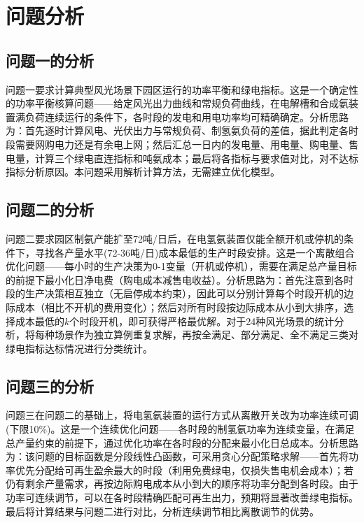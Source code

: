 \section{问题分析}

\subsection{问题一的分析}

问题一要求计算典型风光场景下园区运行的功率平衡和绿电指标。这是一个确定性的功率平衡核算问题——给定风光出力曲线和常规负荷曲线，在电解槽和合成氨装置满负荷连续运行的条件下，各时段的发电和用电功率均可精确确定。分析思路为：首先逐时计算风电、光伏出力与常规负荷、制氢氨负荷的差值，据此判定各时段需要网购电力还是有余电上网；然后汇总一日内的发电量、用电量、购电量、售电量，计算三个绿电直连指标和吨氨成本；最后将各指标与要求值对比，对不达标指标分析原因。本问题采用解析计算方法，无需建立优化模型。

\subsection{问题二的分析}

问题二要求园区制氨产能扩至72吨/日后，在电氢氨装置仅能全额开机或停机的条件下，寻找各产量水平(72-36吨/日)成本最低的生产时段安排。这是一个离散组合优化问题——每小时的生产决策为0-1变量（开机或停机），需要在满足总产量目标的前提下最小化日净电费（购电成本减售电收益）。分析思路为：首先注意到各时段的生产决策相互独立（无启停成本约束），因此可以分别计算每个时段开机的边际成本（相比不开机的费用变化）；然后对所有时段按边际成本从小到大排序，选择成本最低的$k$个时段开机，即可获得严格最优解。对于24种风光场景的统计分析，将每种场景作为独立算例重复求解，再按全满足、部分满足、全不满足三类对绿电指标达标情况进行分类统计。

\subsection{问题三的分析}

问题三在问题二的基础上，将电氢氨装置的运行方式从离散开关改为功率连续可调(下限10\%)。这是一个连续优化问题——各时段的制氢氨功率为连续变量，在满足总产量约束的前提下，通过优化功率在各时段的分配来最小化日总成本。分析思路为：该问题的目标函数是分段线性凸函数，可采用贪心分配策略求解——首先将功率优先分配给可再生盈余最大的时段（利用免费绿电，仅损失售电机会成本）；若仍有剩余产量需求，再按边际购电成本从小到大的顺序将功率分配到各时段。由于功率可连续调节，可以在各时段精确匹配可再生出力，预期将显著改善绿电指标。最后将计算结果与问题二进行对比，分析连续调节相比离散调节的优势。

